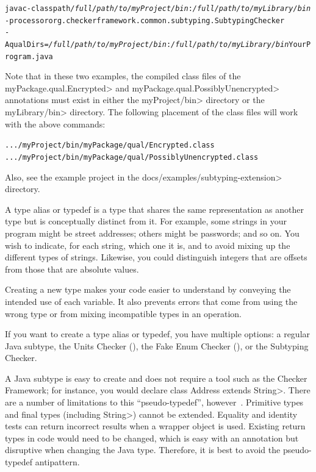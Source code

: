 \begin{enumerate}
\begin{alltt}
  javac -classpath \textit{/full/path/to/myProject/bin}:\textit{/full/path/to/myLibrary/bin} \ttbs
        -processor org.checkerframework.common.subtyping.SubtypingChecker \ttbs
        -AqualDirs=\textit{/full/path/to/myProject/bin}:\textit{/full/path/to/myLibrary/bin} YourProgram.java
\end{alltt}

\begin{sloppypar}
Note that in these two examples, the compiled class files of the
\<myPackage.qual.Encrypted> and \<myPackage.qual.PossiblyUnencrypted> annotations
must exist in either the \<myProject/bin> directory or the \<myLibrary/bin>
directory. The following placement of the class files will work with the above
commands:
\end{sloppypar}

\begin{alltt}
  .../myProject/bin/myPackage/qual/Encrypted.class
  .../myProject/bin/myPackage/qual/PossiblyUnencrypted.class
\end{alltt}

\end{enumerate}

Also, see the example project in the \<docs/examples/subtyping-extension> directory.



A type alias or typedef is a type that shares the same representation as
another type but is conceptually distinct from it.  For example, some
strings in your program might be street addresses; others might be passwords;
and so on.  You wish to indicate, for each string, which one it is, and to
avoid mixing up the different types of strings.  Likewise, you could
distinguish integers that are offsets from those that are absolute values.

Creating a new type makes your code easier to understand by conveying the
intended use of each variable.  It also prevents errors that come from
using the wrong type or from mixing incompatible types in an operation.

If you want to create a type alias or typedef, you have multiple options:
a regular Java subtype,
the Units Checker (),
the Fake Enum Checker (), or
the Subtyping Checker.

A Java subtype is easy to create and does not require a tool such as the
Checker Framework; for instance, you would declare \<class Address extends
String>.  There are a number of limitations to this ``pseudo-typedef'',
however~\cite{Goetz2006:typedef}.
Primitive types and final types (including \<String>) cannot be extended.
Equality and identity tests can return incorrect results when a wrapper
object is used.  Existing return types in code would need to be changed,
which is easy with an annotation but disruptive when changing the Java type.
Therefore, it is best to avoid the pseudo-typedef antipattern.

